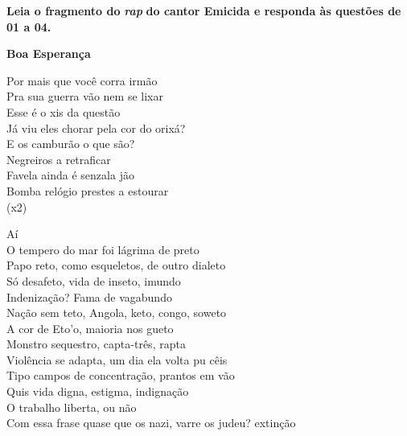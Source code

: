 \textbf{Leia o fragmento do }\textbf{\textit{rap}}\textbf{ do cantor Emicida e responda às questões de 01 a 04.}

\begin{center}
    \textbf{Boa Esperança}
\end{center}

\noindent
Por mais que você corra irmão\\
Pra sua guerra vão nem se lixar\\
Esse é o xis da questão\\
Já viu eles chorar pela cor do orixá?\\
E os camburão o que são?\\
Negreiros a retraficar\\
Favela ainda é senzala jão\\
Bomba relógio prestes a estourar\\
(x2)

\vspace{0.3cm}

\noindent
Aí\\
O tempero do mar foi lágrima de preto\\
Papo reto, como esqueletos, de outro dialeto\\
Só desafeto, vida de inseto, imundo\\
Indenização? Fama de vagabundo\\
Nação sem teto, Angola, keto, congo, soweto\\
A cor de Eto'o, maioria nos gueto\\
Monstro sequestro, capta-três, rapta\\
Violência se adapta, um dia ela volta pu cêis\\
Tipo campos de concentração, prantos em vão\\
Quis vida digna, estigma, indignação\\
O trabalho liberta, ou não\\
Com essa frase quase que os nazi, varre os judeu? extinção\\
[...]


